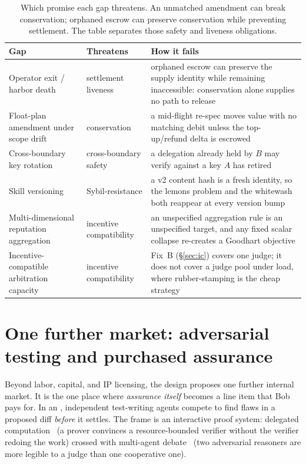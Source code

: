 \documentclass[11pt,a4paper]{article}
\theoremstyle{definition}
\theoremstyle{definition}
\theoremstyle{remark}
\begin{document}
\begin{table}[H]
\centering
\small
\caption{Which promise each gap threatens. An unmatched amendment can
break conservation; orphaned escrow can preserve conservation while preventing
settlement. The table separates those safety and liveness obligations.}
\label{tab:gaps}
\begin{tabularx}{\textwidth}{@{}>{\raggedright\arraybackslash}p{} l >{\raggedright\arraybackslash}X@{}}
\toprule
\textbf{Gap} & \textbf{Threatens} & \textbf{How it fails} \\
\midrule
Operator exit / harbor death & settlement liveness &
  orphaned escrow can preserve the supply identity while remaining
  inaccessible: conservation alone supplies no path to release \\
Float-plan amendment under scope drift & conservation &
  a mid-flight re-spec moves value with no matching debit unless the top-up/refund
  delta is escrowed \\
Cross-boundary key rotation & cross-boundary safety &
  a delegation already held by $B$ may verify against a key $A$ has retired \\
Skill versioning & Sybil-resistance &
  a v2 content hash is a fresh identity, so the lemons problem and the
  whitewash both reappear at every version bump \\
Multi-dimensional reputation aggregation & incentive compatibility &
  an unspecified aggregation rule is an unspecified target, and any fixed scalar
  collapse re-creates a Goodhart objective \\
Incentive-compatible arbitration capacity & incentive compatibility &
  Fix~B (\S\ref{sec:ic}) covers one judge; it does not cover a judge pool under
  load, where rubber-stamping is the cheap strategy \\
\bottomrule
\end{tabularx}
\end{table}

\section{One further market: adversarial testing and purchased assurance}\label{sec:adversarial-tests}

Beyond labor, capital, and IP licensing, the design proposes one further internal
market. It is the one place where \emph{assurance itself} becomes a line item
that Bob pays for. In an ,
independent test-writing agents compete to find flaws in a proposed diff
\emph{before} it settles. The frame is an interactive proof system: delegated
computation~ (a prover convinces a resource-bounded verifier
without the verifier redoing the work) crossed with multi-agent
debate~ (two adversarial reasoners are more legible to a judge than
one cooperative one).
\end{document}
